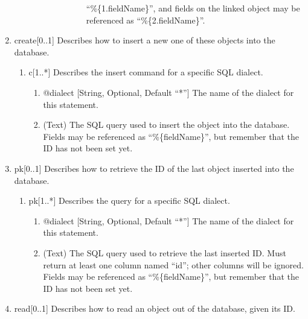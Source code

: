 \documentclass{book}
\begin{document}
\begin{enumerate}
\begin{enumerate}
\begin{enumerate}
\begin{enumerate}
\begin{itemize}
\begin{itemize}
                              ``\%\{1.fieldName\}'', and fields on the linked
                              object may be referenced as ``\%\{2.fieldName\}''.
                    \end{itemize}
                \end{itemize}
            \end{enumerate}
        \end{enumerate}
    \end{enumerate}
    \item create[0..1] Describes how to insert a new one of these objects into
          the database.
    \begin{enumerate}
        \item c[1..*] Describes the insert command for a specific SQL dialect.
        \begin{enumerate}
            \item @dialect [String, Optional, Default ``*''] The name of the
                  dialect for this statement.
            \item (Text) The SQL query used to insert the object into the
                  database. Fields may be referenced as ``\%\{fieldName\}'', but
                  remember that the ID has not been set yet.
        \end{enumerate}
    \end{enumerate}
    \item pk[0..1] Describes how to retrieve the ID of the last object inserted
          into the database.
    \begin{enumerate}
        \item pk[1..*] Describes the query for a specific SQL dialect.
        \begin{enumerate}
            \item @dialect [String, Optional, Default ``*''] The name of the
                  dialect for this statement.
            \item (Text) The SQL query used to retrieve the last inserted ID.
                  Must return at least one column named ``id''; other columns
                  will be ignored. Fields may be referenced as
                  ``\%\{fieldName\}'', but remember that the ID has not been set
                  yet.
        \end{enumerate}
    \end{enumerate}
    \item read[0..1] Describes how to read an object out of the database, given
          its ID.

\end{enumerate}
\end{document}
